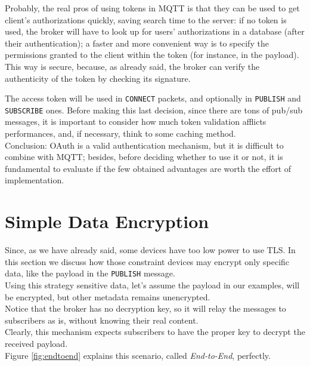 \documentclass[12pt]{report}
\begin{document}
{{Probably, the real pros of using tokens in MQTT is that they can be used to get client's authorizations quickly, saving search time to the server: if no token is used, the broker will have to look up for users' authorizations in a database (after their authentication); a faster and more convenient way is to specify the permissions granted to the client within the token (for instance, in the payload). \\
This way is secure, because, as already said, the broker can verify the authenticity of the token by checking its signature.

The access token will be used in \texttt{CONNECT} packets, and optionally in \texttt{PUBLISH} and \texttt{SUBSCRIBE} ones. Before making this last decision, since there are tons of pub/sub messages, it is important to consider how much token validation afflicts performances, and, if necessary, think to some caching method.\\

Conclusion: OAuth is a valid authentication mechanism, but it is difficult to combine with MQTT; besides, before deciding whether to use it or not, it is fundamental to evaluate if the few obtained advantages are worth the effort of implementation.


\section{Simple Data Encryption}
\bigskip
Since, as we have already said, some devices have too low power to use TLS.
In this section we discuss how those constraint devices may encrypt only specific data, like the payload in the \texttt{PUBLISH} message.\\

Using this strategy sensitive data, let's assume the payload in our examples, will be encrypted, but other metadata remains unencrypted.\\
Notice that the broker has no decryption key, so it will relay the messages to subscribers as is, without knowing their real content.\\
Clearly, this mechanism expects subscribers to have the proper key to decrypt the received payload.\\

Figure \ref{fig:endtoend} explains this scenario, called \emph{End-to-End}, perfectly.

}}
\end{document}
